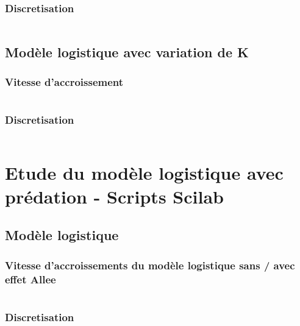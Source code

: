 \documentclass{article}
\begin{document}
\begin{verbatim}
\end{verbatim}

\subsubsection{Discretisation}

\begin{verbatim}
\end{verbatim}

\subsection{Modèle logistique avec variation de K}

\subsubsection{Vitesse d'accroissement}

\begin{verbatim}
\end{verbatim}

\subsubsection{Discretisation}

\begin{verbatim}
\end{verbatim}

\section{Etude du modèle logistique avec prédation - Scripts Scilab}

\subsection{Modèle logistique}

\subsubsection{Vitesse d'accroissements du modèle logistique sans / avec effet Allee}

\begin{verbatim}
\end{verbatim}

\subsubsection{Discretisation}
\end{document}
